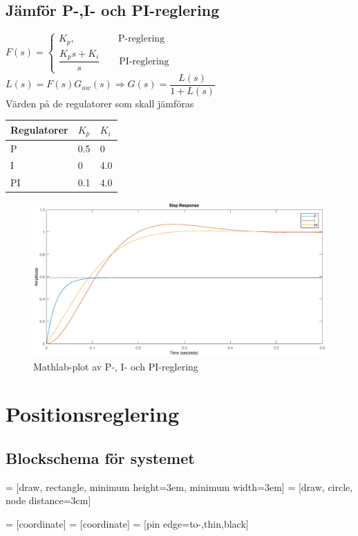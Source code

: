 \documentclass[11pt]{article}
\begin{document}
\subsection{Jämför P-,I- och PI-reglering}
$
F(s)=
\begin{cases}
K_p, \quad \quad \quad \quad \ \ 
 \text{P-reglering} \\[0.5em]
\dfrac{K_ps+K_i}{s} \quad \quad \text{PI-reglering}
\end{cases}
$
$L(s)=F(s)G_{uw}(s)\Rightarrow G(s)=\dfrac{L(s)}{1+L(s)}$\\[0.5em]
Värden på de regulatorer som skall jämföras\\[1em]
\begin{tabular}{|l|l|l|}
\hline
Regulatorer&$K_p$&$K_i$ \\ \hline \hline
P&0.5&0 \\ \hline
I&0&4.0 \\ \hline
PI&0.1&4.0 \\ \hline
\end{tabular}
\begin{figure}[h!]
\centering
\includegraphics[scale=0.45]{Figures/plot1}
\caption{Mathlab-plot av P-, I- och PI-reglering}
\end{figure}
\section{Positionsreglering}
\subsection{Blockschema för systemet}
 = [draw, rectangle, 
    minimum height=3em, minimum width=3em]
 = [draw, circle, node distance=3cm]


 = [coordinate]
 = [coordinate]
 = [pin edge={to-,thin,black}]
\renewcommand{\summa}{\huge$\sum_{}^{}$}
\end{document}
